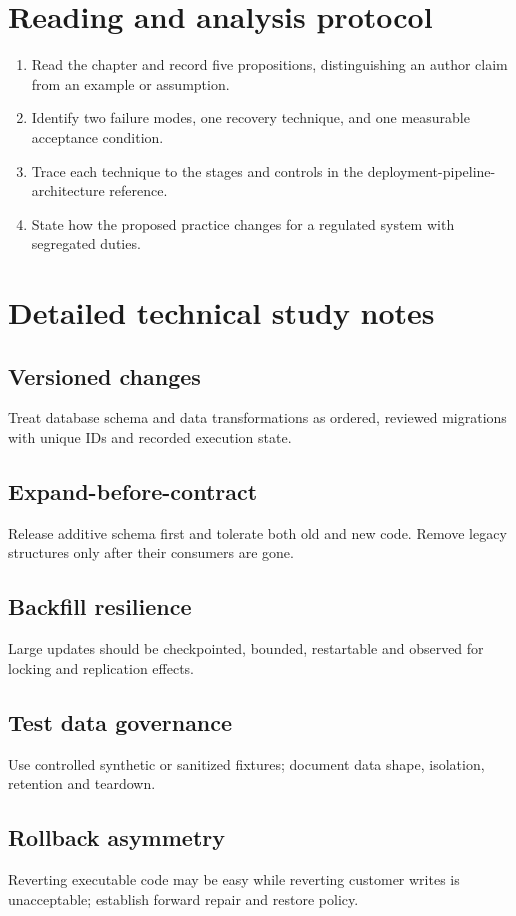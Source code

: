 \documentclass[10pt,letterpaper]{article}
\begin{document}
\section{Reading and analysis protocol}
\begin{enumerate}
\item Read the chapter and record five propositions, distinguishing an author claim from an example or assumption.
\item Identify two failure modes, one recovery technique, and one measurable acceptance condition.
\item Trace each technique to the stages and controls in the deployment-pipeline-architecture reference.
\item State how the proposed practice changes for a regulated system with segregated duties.
\end{enumerate}

\section{Detailed technical study notes}
\subsection{Versioned changes}
Treat database schema and data transformations as ordered, reviewed migrations with unique IDs and recorded execution state.

\subsection{Expand-before-contract}
Release additive schema first and tolerate both old and new code. Remove legacy structures only after their consumers are gone.

\subsection{Backfill resilience}
Large updates should be checkpointed, bounded, restartable and observed for locking and replication effects.

\subsection{Test data governance}
Use controlled synthetic or sanitized fixtures; document data shape, isolation, retention and teardown.

\subsection{Rollback asymmetry}
Reverting executable code may be easy while reverting customer writes is unacceptable; establish forward repair and restore policy.
\end{document}
